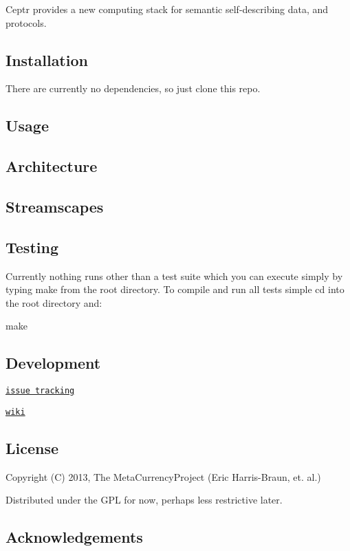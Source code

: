 Ceptr provides a new computing stack for semantic self-\/describing data, and protocols.

\subsection*{Installation}

There are currently no dependencies, so just clone this repo.

\subsection*{Usage}

\subsection*{Architecture}

\subsection*{Streamscapes}

\subsection*{Testing}

Currently nothing runs other than a test suite which you can execute simply by typing make from the root directory. To compile and run all tests simple cd into the root directory and\+: \begin{DoxyVerb}make
\end{DoxyVerb}


\subsection*{Development}

\href{https://github.com/zippy/ceptr/issue}{\tt issue tracking}

\href{https://github.com/zippy/ceptr/wiki}{\tt wiki}

\subsection*{License}

Copyright (C) 2013, The Meta\+Currency\+Project (Eric Harris-\/\+Braun, et. al.)

Distributed under the G\+P\+L for now, perhaps less restrictive later.

\subsection*{Acknowledgements}